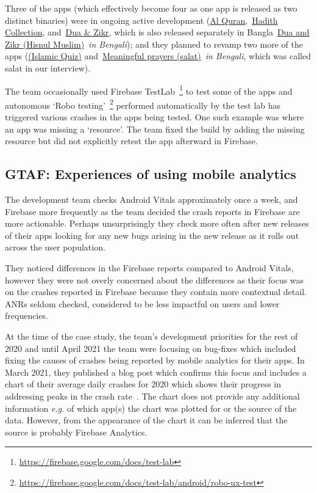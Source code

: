 Three of the apps (which effectively become four as one app is released as two distinct binaries) were in ongoing active development (\href{https://play.google.com/store/apps/details?id=com.greentech.quran}{Al Quran},~\href{https://play.google.com/store/apps/details?id=com.greentech.hadith}{Hadith Collection}, and~\href{https://play.google.com/store/apps/details?id=com.greentech.hisnulmuslim}{Dua \& Zikr}, which is also released separately in Bangla~\href{https://play.google.com/store/apps/details?id=com.greentech.hisnulmuslimbn}{{Dua and Zikr (Hisnul Muslim)}}~\emph{in Bengali}); and they planned to revamp two more of the apps (\href{https://play.google.com/store/apps/details?id=com.greentech.islamicquiz}{(Islamic Quiz)} and~\href{https://play.google.com/store/apps/details?id=com.greentech.salatbn}{Meaningful prayers (salat)}~\textit{in Bengali}, which was called salat in our interview).

The team occasionally used Firebase TestLab~\footnote{\url{https://firebase.google.com/docs/test-lab}} to test some of the apps and autonomous `Robo testing'~\footnote{\url{https://firebase.google.com/docs/test-lab/android/robo-ux-test}} performed automatically by the test lab has triggered various crashes in the apps being tested. One such example was where an app was missing a `resource'. The team fixed the build by adding the missing resource but did not explicitly retest the app afterward in Firebase.  

\subsection{GTAF: Experiences of using mobile analytics}
The development team checks Android Vitals approximately once a week, and Firebase more frequently as the team decided the crash reports in Firebase are more actionable. Perhaps unsurprisingly they check more often after new releases of their apps looking for any new bugs arising in the new release as it rolls out across the user population.

They noticed differences in the Firebase reports compared to Android Vitals, however they were not overly concerned about the differences as their focus was on the crashes reported in Firebase because they contain more contextual detail. ANRs seldom checked, considered to be less impactful on users and lower frequencies. %

At the time of the case study, the team's development priorities for the rest of 2020 and until April 2021 the team were focusing on bug-fixes which included fixing the causes of crashes being reported by mobile analytics for their apps. In March 2021, they published a blog post which confirms this focus and includes a chart of their average daily crashes for 2020 which shows their progress in addressing peaks in the crash rate~\citep{gtafblog2021_gtaf_accomplishment_2020}. The chart does not provide any additional information \emph{e.g.} of which app(s) the chart was plotted for or the source of the data. However, from the appearance of the chart it can be inferred that the source is probably Firebase Analytics.

